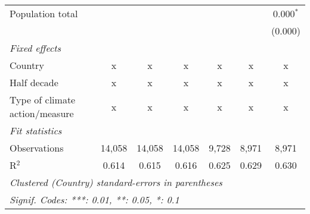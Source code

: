 \begin{tabular}{lcccccc}
   Population total                                               &             &                &                &                &                & 0.000$^{*}$\\   
                                                                  &             &                &                &                &                & (0.000)\\   
   \emph{Fixed effects}\\
   Country                                                        & x           & x              & x              & x              & x              & x\\  
   Half decade                                                    & x           & x              & x              & x              & x              & x\\  
   Type of climate action/measure                                 & x           & x              & x              & x              & x              & x\\  
   \midrule \emph{Fit statistics}\\
   Observations                                                   & 14,058      & 14,058         & 14,058         & 9,728          & 8,971          & 8,971\\  
   R$^2$                                                          & 0.614       & 0.615          & 0.616          & 0.625          & 0.629          & 0.630\\  
   \midrule
   \multicolumn{7}{l}{\emph{Clustered (Country) standard-errors in parentheses}}\\
   \multicolumn{7}{l}{\emph{Signif. Codes: ***: 0.01, **: 0.05, *: 0.1}}\\
\end{tabular}
\par\endgroup


